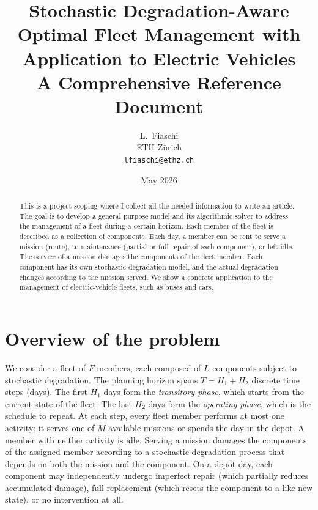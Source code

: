 \documentclass[11pt,a4paper]{article}
\theoremstyle{plain}
\theoremstyle{definition}
\theoremstyle{remark}
\begin{document}
\title{\textbf{Stochastic Degradation-Aware Optimal Fleet Management with Application to Electric Vehicles}\\[6pt]
{\normalsize A Comprehensive Reference Document}}
\author{L.\ Fiaschi \\ \small ETH Z\"urich \\ \small \texttt{lfiaschi@ethz.ch}}
\date{May 2026}

\maketitle
\begin{abstract}
This is a project scoping where I collect all the needed information to write an article.
The goal is to develop a general purpose model and its algorithmic solver to address the management of a fleet during a certain horizon.
Each member of the fleet is described as a collection of components.
Each day, a member can be sent to serve a mission (route), to maintenance (partial or full repair of each component), or left idle.
The service of a mission damages the components of the fleet member.
Each component has its own stochastic degradation model, and the actual degradation changes according to the mission served.
We show a concrete application to the management of electric-vehicle fleets, such as buses and cars.
\end{abstract}
\tableofcontents
\newpage

\section{Overview of the problem}
\label{sec:overview}

We consider a fleet of $F$ members, each composed of $L$ components subject to stochastic degradation.
The planning horizon spans $T = H_1 + H_2$ discrete time steps (days).
The first $H_1$ days form the \emph{transitory phase}, which starts from the current state of the fleet.
The last $H_2$ days form the \emph{operating phase}, which is the schedule to repeat.
At each step, every fleet member performs at most one activity: it serves one of $M$ available missions or spends the day in the depot.
A member with neither activity is idle.
Serving a mission damages the components of the assigned member according to a stochastic degradation process that depends on both the mission and the component.
On a depot day, each component may independently undergo imperfect repair (which partially reduces accumulated damage), full replacement (which resets the component to a like-new state), or no intervention at all.
\end{document}

